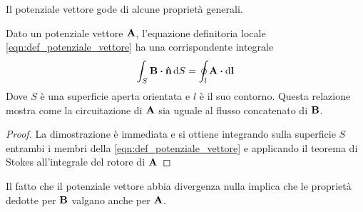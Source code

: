 Il potenziale vettore gode di alcune proprietà generali.
\begin{thm}
    Dato un potenziale vettore $\vb{A}$, l'equazione definitoria locale \eqref{eqn:def_potenziale_vettore} ha una corrispondente integrale
    \[
        \int_S \vb{B}\vdot\vu{n}\dd{S}=\oint_l\vb{A}\vdot\dd{\vb{l}}
    \]
    Dove $S$ è una superficie aperta orientata e $l$ è il suo contorno. Questa relazione mostra come la circuitazione di $\vb{A}$
    sia uguale al flusso concatenato di $\vb{B}$.
\end{thm}
\begin{proof}
    La dimostrazione è immediata e si ottiene integrando sulla superficie $S$ entrambi i membri della
    \eqref{eqn:def_potenziale_vettore} e applicando il teorema di Stokes all'integrale del rotore di $\vb{A}$
\end{proof}
Il fatto che il potenziale vettore abbia divergenza nulla implica che le proprietà dedotte per $\vb{B}$ valgano
anche per $\vb{A}$.

